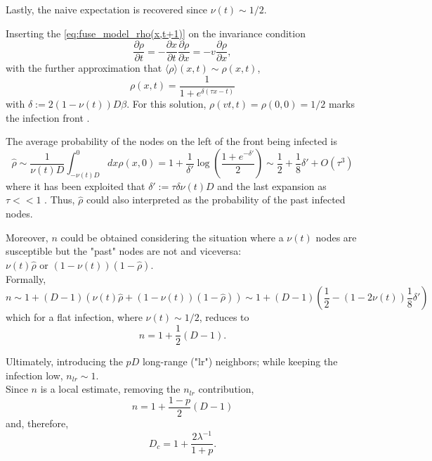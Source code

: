 \documentclass[a4paper,10pt, oneside]{book} %
\theoremstyle{definition}
\begin{document}
Lastly, the naive expectation is recovered since $\nu(t) \sim 1/2$. 

Inserting the \autoref{eq:fuse_model_rho(x,t+1)} on the invariance condition 
\begin{equation}
	\frac{\partial \rho}{\partial t} = - \frac{\partial x}{\partial t} \frac{\partial \rho}{\partial x} = -v \frac{\partial \rho}{\partial x},
\end{equation}
with the further approximation that $\langle \rho \rangle(x,t) \sim \rho(x,t)$,
\begin{equation}
	\rho(x,t) = \frac{1}{1+e^{\delta(\tau x - t)}}
\end{equation}
with $\delta:= 2(1-\nu(t))D \beta$. 
For this solution, $\rho(vt,t) = \rho(0,0) = 1/2$ marks the infection front \cite{Thurner::Appendix_NetBasedExpl}. 

The average probability of the nodes on the left of the front being infected is
\begin{equation}
	\hat{\rho} \sim \frac{1}{\nu(t) D} \int_{-\nu(t) D}^{0} dx \rho(x,0) = 1+ \frac{1}{\delta'} \log( \frac{1+e^{-\delta'}}{2} )
	\sim \frac{1}{2} + \frac{1}{8} \delta' + O(\tau^3) 
	\label{eq:rho_hat_fuse_model}
\end{equation}
where it has been exploited that $\delta':=\tau \delta \nu(t) D$ and the last expansion as $\tau<<1$ \cite{Thurner::Appendix_NetBasedExpl}. Thus, $\hat{\rho}$ could also interpreted as the probability of the past infected nodes.

Moreover, $n$ could be obtained considering the situation where a $\nu(t)$ nodes are susceptible but the "past" nodes are not and viceversa: $\nu(t) \hat{\rho} \text{ or } (1-\nu(t))(1- \hat{\rho})$. 
\\Formally,
\begin{equation}
	n \sim 1+ (D-1)(\nu(t)\hat{\rho}+(1-\nu(t))(1-\hat{\rho}))
	\sim 1+ (D-1)(\frac{1}{2} - (1-2\nu(t)) \frac{1}{8} \delta')
\end{equation}
which for a flat infection, where $\nu(t)\sim 1/2$, reduces to
\begin{equation}
	n = 1 + \frac{1}{2}(D-1).
\end{equation} 

Ultimately, introducing the $pD$ long-range ("lr") neighbors; while keeping the infection low, $n_{lr} \sim 1$.
\\Since $n$ is a local estimate, removing the $n_{lr}$ contribution,
\begin{equation}
	n = 1 + \frac{1-p}{2}(D-1)
\end{equation}   
and, therefore,
\begin{equation}
	D_c = 1+ \frac{2 \lambda^{-1}}{1+p}.
	\label{eq:final_D_c_fuse_network}
\end{equation}
\end{document}
